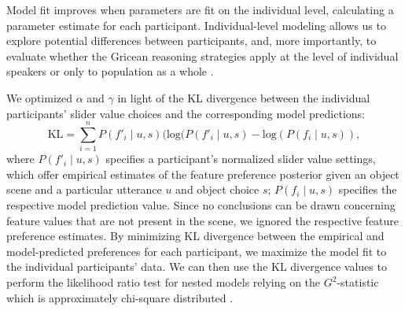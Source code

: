 \documentclass[10pt,a4paper]{article}
\newcommand{\gcs}[1]{\textcolor{blue}{[gcs: #1]}}
\begin{document}
Model fit improves when parameters are fit on the individual level, calculating a parameter estimate for each participant. Individual-level modeling allows us to explore potential differences between participants, and, more importantly, to evaluate whether the Gricean reasoning strategies apply at the level of individual speakers or only to population as a whole \cite{franke2016reasoning}. 

We optimized $\alpha$ and $\gamma$ in light of the KL divergence between the individual participants' slider value choices and the corresponding model predictions:
$$\textrm{KL} = \sum_{i=1}^{n} P(f'_i\mid u,s) (\textrm {log} (P(f'_i\mid u,s) - \textrm {log} (P(f_i\mid u,s)),$$
where $P(f'_i\mid u,s)$ specifies a participant's normalized slider value settings, which offer empirical estimates of the feature preference posterior given an object scene and a particular utterance $u$ and object choice $s$; $P(f_i\mid u,s)$ specifies the respective model prediction value. 
Since no conclusions can be drawn concerning feature values that are not present in the scene, we ignored the respective feature preference estimates. By minimizing KL divergence between the empirical and model-predicted preferences for each participant, we maximize the model fit to the individual participants' data. We can then use the KL divergence values to perform the likelihood ratio test for nested models relying on the $G^2$-statistic which is approximately chi-square distributed \cite{Lewandowsky:2011}. 


\end{document}
